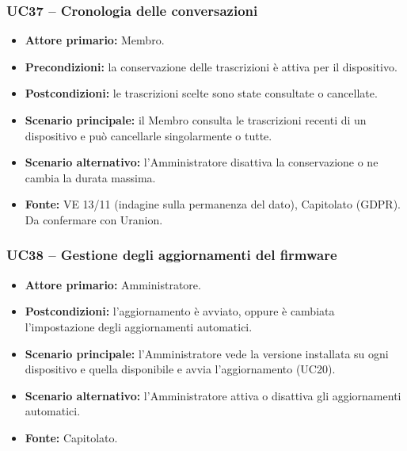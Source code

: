 \documentclass[12pt,a4paper]{article}
\newcommand{\tightlist}{\setlength{\itemsep}{1pt}\setlength{\parskip}{0pt}}
\begin{document}
\subsubsection{UC37 -- Cronologia delle conversazioni}

\begin{itemize}

\tightlist

\item \textbf{Attore primario:} Membro.

\item \textbf{Precondizioni:} la conservazione delle trascrizioni è attiva per il dispositivo.

\item \textbf{Postcondizioni:} le trascrizioni scelte sono state consultate o cancellate.

\item \textbf{Scenario principale:} il Membro consulta le trascrizioni recenti di un dispositivo e può cancellarle singolarmente o tutte.

\item \textbf{Scenario alternativo:} l'Amministratore disattiva la conservazione o ne cambia la durata massima.

\item \textbf{Fonte:} VE 13/11 (indagine sulla permanenza del dato), Capitolato (GDPR). Da confermare con Uranion.

\end{itemize}



\subsubsection{UC38 -- Gestione degli aggiornamenti del firmware}

\begin{itemize}

\tightlist

\item \textbf{Attore primario:} Amministratore.

\item \textbf{Postcondizioni:} l'aggiornamento è avviato, oppure è cambiata l'impostazione degli aggiornamenti automatici.

\item \textbf{Scenario principale:} l'Amministratore vede la versione installata su ogni dispositivo e quella disponibile e avvia l'aggiornamento (UC20).

\item \textbf{Scenario alternativo:} l'Amministratore attiva o disattiva gli aggiornamenti automatici.

\item \textbf{Fonte:} Capitolato.

\end{itemize}
\end{document}

